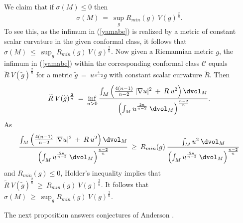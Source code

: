 We claim that if $\sigma(M) \le 0$ then
\begin{equation} \label{testt}
\sigma(M) \: = \: \sup_{g} R_{min}(g) \: V(g)^{\frac2n}.
\end{equation}
To see this, as
the infimum in (\ref{yamabe}) is realized by a metric of constant
scalar curvature in the given conformal class, it follows that
$\sigma(M) \: \le \: \sup_{g} R_{min}(g) \: V(g)^{\frac2n}$.
Now given a Riemannian metric $g$, the infimum in (\ref{yamabe})
within the corresponding conformal class ${\mathcal C}$
equals $\widetilde{R} \: V(\widetilde{g})^{\frac{2}{n}}$
for a metric $\widetilde{g} \: = \: u^{\frac{4}{n-2}} g$ with
constant scalar curvature $\widetilde{R}$. Then
\begin{equation}
\widetilde{R} \: V(\widetilde{g})^{\frac{2}{n}} \: = \:
\inf_{u > 0} \frac{
\int_M \left(
\frac{4(n-1)}{n-2} \:  |\nabla u|^2 \: + \:
R \: u^2 \right) \dvol_M
}{
\left( \int_M u^{\frac{2n}{n-2}} \: \dvol_M \right)^{\frac{n-2}{n}}}.
\end{equation}
As
\begin{equation}
\frac{ \int_M \left(
\frac{4(n-1)}{n-2} \:  |\nabla u|^2 \: + \:
R \: u^2 \right) \dvol_M
}{
\left( \int_M u^{\frac{2n}{n-2}} \: \dvol_M \right)^{\frac{n-2}{n}}}
\: \ge \: R_{min}(g) \: \frac{
\int_M u^2 \: \dvol_M
}{
\left( \int_M u^{\frac{2n}{n-2}} \: \dvol_M \right)^{\frac{n-2}{n}}}
\end{equation}
and $R_{min}(g) \le 0$,
Holder's inequality implies that
$\widetilde{R} \: V(\widetilde{g})^{\frac{2}{n}} \: \ge \:
{R}_{min}(g) \: V({g})^{\frac{2}{n}}$.
It follows that
$\sigma(M) \: \ge \: \sup_{g} R_{min}(g) \: V(g)^{\frac2n}$.

The next proposition
answers conjectures of Anderson \cite{Anderson3}.

